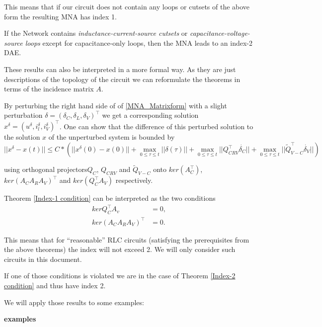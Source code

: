 This means that if our circuit does not contain any loops or cutsets of the above form the resulting MNA has index 1.

\begin{theorem} \cite{Tischendorf2005Topological} \label{Index-2 condition}
	If the Network contains \emph{inductance-current-source cutsets} or \emph{capacitance-voltage-source loops} except for capacitance-only loops, then the MNA leads to an index-2 DAE.
\end{theorem}

These results can also be interpreted in a more formal way. As they are just descriptions of the topology of the circuit we can reformulate the theorems in terms of the incidence matrix $A$.

By perturbing the right hand side of of \ref{MNA_Matrixform} with a slight perturbation $\delta = (\delta_C, \delta_L, \delta_V)^\top$ we get a corresponding solution $x^\delta = (u^\delta, i_l^\delta, i_V^\delta)^\top$. One can show that the difference of this perturbed solution to the solution $x$ of the unperturbed system is bounded by
\begin{displaymath}
	|| x^\delta - x(t) || \leq C * \left( ||x^\delta (0) - x(0)|| + \max_{0 \leq \tau \leq t} ||\delta(\tau)|| + \max_{0 \leq \tau \leq t} ||Q_{CRV}^\top \dot{\delta_C}|| + \max_{0 \leq \tau \leq t} ||\tilde{Q}_{V-C}^\top \dot{\delta_V}|| \right)
\end{displaymath}

using orthogonal projectors$Q_C$, $Q_{CRV}$ and $\tilde{Q}_{V-C}$  onto $ker(A_C^\top)$, $ker(A_CA_RA_V)^\top$ and $ker(Q_C^\top A_V)$ respectively.

Theorem \ref{Index-1 condition} can be interpreted as the two conditions
	\begin{align}
		kerQ_C^\top A_v &= {0}, \\
		ker(A_C A_R A_V)^\top &= {0}.
	\end{align}

This means that for ``reasonable'' RLC circuits (satisfying the prerequisites from the above theorems) the index will not exceed 2. We will only consider such circuits in this document.

If one of those conditions is violated we are in the case of Theorem \ref{Index-2 condition} and thus have index 2.

We will apply those results to some examples: %

\textbf{examples}